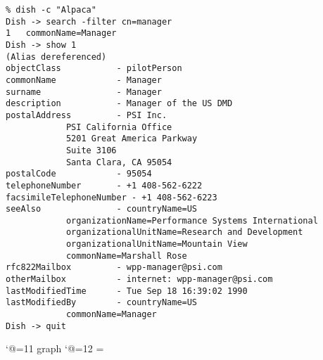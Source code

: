 
\smaller
\begin{verbatim}
% dish -c "Alpaca"
Dish -> search -filter cn=manager
1   commonName=Manager
Dish -> show 1
(Alias dereferenced)
objectClass           - pilotPerson
commonName            - Manager
surname               - Manager
description           - Manager of the US DMD
postalAddress         - PSI Inc.
			PSI California Office
			5201 Great America Parkway
			Suite 3106
			Santa Clara, CA 95054
postalCode            - 95054
telephoneNumber       - +1 408-562-6222
facsimileTelephoneNumber - +1 408-562-6223
seeAlso               - countryName=US
			organizationName=Performance Systems International
			organizationalUnitName=Research and Development
			organizationalUnitName=Mountain View
			commonName=Marshall Rose
rfc822Mailbox         - wpp-manager@psi.com
otherMailbox          - internet: wpp-manager@psi.com
lastModifiedTime      - Tue Sep 18 16:39:02 1990
lastModifiedBy        - countryName=US
			commonName=Manager
Dish -> quit
\end{verbatim}

\catcode`@=11
\expandafter\ifx\csname graph\endcsname\relax {}\box\chardef\insc@unt\graph\fi
\catcode`@=12
\setbox\graph=\empty
